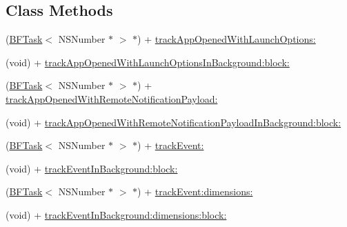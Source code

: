 \subsection*{Class Methods}
\begin{DoxyCompactItemize}
\item 
(\hyperlink{class_b_f_task}{B\+F\+Task}$<$ N\+S\+Number $\ast$ $>$ $\ast$) + \hyperlink{interface_p_f_analytics_a8bbb075cc5890011fb56c77f2f02130a}{track\+App\+Opened\+With\+Launch\+Options\+:}
\begin{DoxyCompactList}\small\item\em 

 \end{DoxyCompactList}\item 
(void) + \hyperlink{interface_p_f_analytics_a76abf0a0b48b484e88018912f4dba694}{track\+App\+Opened\+With\+Launch\+Options\+In\+Background\+:block\+:}
\item 
(\hyperlink{class_b_f_task}{B\+F\+Task}$<$ N\+S\+Number $\ast$ $>$ $\ast$) + \hyperlink{interface_p_f_analytics_a3df63c4b40e527724be7119b391dc0e8}{track\+App\+Opened\+With\+Remote\+Notification\+Payload\+:}
\item 
(void) + \hyperlink{interface_p_f_analytics_a00752c6965927d6846b63156e4afc5f9}{track\+App\+Opened\+With\+Remote\+Notification\+Payload\+In\+Background\+:block\+:}
\item 
(\hyperlink{class_b_f_task}{B\+F\+Task}$<$ N\+S\+Number $\ast$ $>$ $\ast$) + \hyperlink{interface_p_f_analytics_ab4dc455223eba807aa02d568526af2c3}{track\+Event\+:}
\begin{DoxyCompactList}\small\item\em 

 \end{DoxyCompactList}\item 
(void) + \hyperlink{interface_p_f_analytics_a2020eca9c64a2a81acbb9e4149353945}{track\+Event\+In\+Background\+:block\+:}
\end{DoxyCompactItemize}
{\bf }\par
\begin{DoxyCompactItemize}
\item 
(\hyperlink{class_b_f_task}{B\+F\+Task}$<$ N\+S\+Number $\ast$ $>$ $\ast$) + \hyperlink{interface_p_f_analytics_a824d5b8973a4a43ce8cea33e630f426f}{track\+Event\+:dimensions\+:}
\item 
(void) + \hyperlink{interface_p_f_analytics_a4ca11c9d753a2ce4018df95e0dcbeb3d}{track\+Event\+In\+Background\+:dimensions\+:block\+:}
\end{DoxyCompactItemize}



